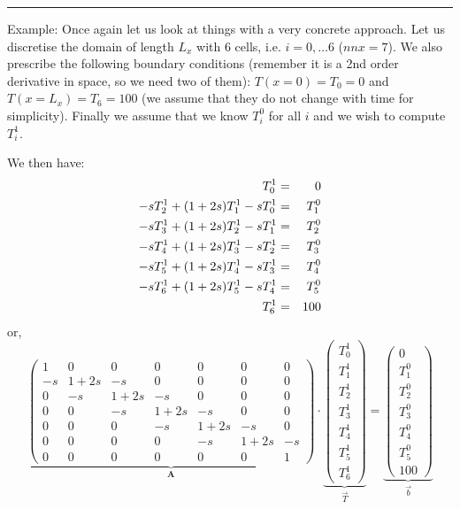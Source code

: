 \begin{center}
\begin{minipage}[t]{0.77\textwidth}
\par\noindent\rule{\textwidth}{0.4pt}
{\color{blue} Example}: 
Once again let us look at things with a very concrete approach. Let us discretise the 
domain of length $L_x$ with 6 cells, i.e. $i=0,\dots 6$ ($nnx=7$).
We also prescribe the following boundary conditions (remember it is a 2nd order derivative in space, 
so we need two of them): $T(x=0)=T_0=0$ and $T(x=L_x)=T_6=100$ (we assume that they 
do not change with time for simplicity). Finally we assume that we 
know $T_i^0$ for all $i$ and we wish to compute $T_i^1$.

We then have:
\begin{eqnarray}
T_0^1 &=& 0 \nonumber\\
-s T_{2}^{1} + (1+2s) T_{1}^{1} - s T_{0}^{1} &=& T_1^{0} \nonumber\\
-s T_{3}^{1} + (1+2s) T_{2}^{1} - s T_{1}^{1} &=& T_2^{0} \nonumber\\
-s T_{4}^{1} + (1+2s) T_{3}^{1} - s T_{2}^{1} &=& T_3^{0} \nonumber\\
-s T_{5}^{1} + (1+2s) T_{4}^{1} - s T_{3}^{1} &=& T_4^{0} \nonumber\\
-s T_{6}^{1} + (1+2s) T_{5}^{1} - s T_{4}^{1} &=& T_5^{0} \nonumber\\
T_6^1 &=& 100\nonumber
\end{eqnarray}
or, 
\[
\underbrace{
\left(
\begin{array}{ccccccc}
1 & 0 & 0 & 0 & 0 & 0 & 0  \\
-s & 1+2s & -s & 0 & 0 & 0 & 0 \\
0 & -s & 1+2s & -s & 0 & 0 & 0 \\
0 & 0 & -s & 1+2s & -s & 0 & 0 \\
0 & 0 & 0 & -s & 1+2s & -s & 0 \\
0 & 0 & 0 & 0 & -s & 1+2s & -s \\
0 & 0 & 0 & 0 & 0 & 0 & 1
\end{array}
\right)
}_{\bm A}
\cdot
\underbrace{
\left(
\begin{array}{ccccccc}
T_0^1 \\ T_1^1 \\ T_2^1 \\ T_3^1 \\ T_4^1 \\ T_5^1 \\ T_6^1  
\end{array}
\right)
}_{\vec{T}}
=
\underbrace{
\left(
\begin{array}{ccccccc}
0 \\ T_1^0\\ T_2^0\\ T_3^0\\ T_4^0\\ T_5^0 \\ 100
\end{array}
\right)
}_{\vec{b}}
\]


\end{minipage}
\end{center}
